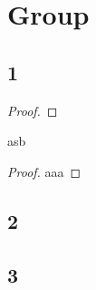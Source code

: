 \documentclass[main]{subfiles} %
\begin{document}
\chapter{Group}
\section{1}

\begin{theorem}
    \lipsum[1]
\end{theorem}
\begin{proof}
    \lipsum[2]
\end{proof}

\begin{definition}
    \lipsum[1]
\end{definition}
\begin{eg}
    \lipsum[2]
\end{eg}
\begin{explanation}
    \lipsum[1]
\end{explanation}

\begin{prop}
    asb    
\end{prop}
\begin{proof}
    aaa
\end{proof}
\section{2}

\section{3}

\lipsum[3-5]
\end{document}
